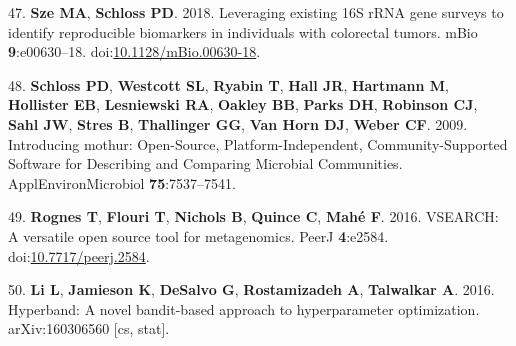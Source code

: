 \documentclass[11pt,]{article}
\begin{document}
\hypertarget{ref-sze_leveraging_2018}{}
47. \textbf{Sze MA}, \textbf{Schloss PD}. 2018. Leveraging existing 16S
rRNA gene surveys to identify reproducible biomarkers in individuals
with colorectal tumors. mBio \textbf{9}:e00630--18.
doi:\href{https://doi.org/10.1128/mBio.00630-18}{10.1128/mBio.00630-18}.

\hypertarget{ref-schloss_introducing_2009}{}
48. \textbf{Schloss PD}, \textbf{Westcott SL}, \textbf{Ryabin T},
\textbf{Hall JR}, \textbf{Hartmann M}, \textbf{Hollister EB},
\textbf{Lesniewski RA}, \textbf{Oakley BB}, \textbf{Parks DH},
\textbf{Robinson CJ}, \textbf{Sahl JW}, \textbf{Stres B},
\textbf{Thallinger GG}, \textbf{Van Horn DJ}, \textbf{Weber CF}. 2009.
Introducing mothur: Open-Source, Platform-Independent,
Community-Supported Software for Describing and Comparing Microbial
Communities. ApplEnvironMicrobiol \textbf{75}:7537--7541.

\hypertarget{ref-rognes_vsearch_2016}{}
49. \textbf{Rognes T}, \textbf{Flouri T}, \textbf{Nichols B},
\textbf{Quince C}, \textbf{Mahé F}. 2016. VSEARCH: A versatile open
source tool for metagenomics. PeerJ \textbf{4}:e2584.
doi:\href{https://doi.org/10.7717/peerj.2584}{10.7717/peerj.2584}.

\hypertarget{ref-li_hyperband:_2016}{}
50. \textbf{Li L}, \textbf{Jamieson K}, \textbf{DeSalvo G},
\textbf{Rostamizadeh A}, \textbf{Talwalkar A}. 2016. Hyperband: A novel
bandit-based approach to hyperparameter optimization. arXiv:160306560
{[}cs, stat{]}.

\newpage

\captionsetup{labelformat=empty}
\small
\end{document}
